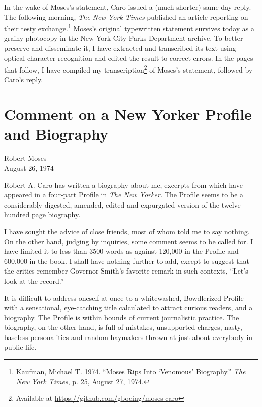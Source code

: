 \documentclass[11pt,letterpaper]{article}
\begin{document}
In the wake of Moses's statement, Caro issued a (much shorter) same-day reply. The following morning, \textit{The New York Times} published an article reporting on their testy exchange.\footnote{Kaufman, Michael T. 1974. \enquote{Moses Rips Into \enquote{Venomous} Biography.} \textit{The New York Times}, p. 25, August 27, 1974.} Moses's original typewritten statement survives today as a grainy photocopy in the New York City Parks Department archive. To better preserve and disseminate it, I have extracted and transcribed its text using optical character recognition and edited the result to correct errors. In the pages that follow, I have compiled my transcription\footnote{Available at \href{https://github.com/gboeing/moses-caro}{https://github.com/gboeing/moses-caro}} of Moses's statement, followed by Caro's reply.

\newpage

\section*{Comment on a New Yorker Profile and Biography}

\noindent Robert Moses\\
\noindent August 26, 1974\\
\vspace{1cm}

\noindent Robert A. Caro has written a biography about me, excerpts from which have appeared in a four-part Profile in \textit{The New Yorker.} The Profile seems to be a considerably digested, amended, edited and expurgated version of the twelve hundred page biography.

I have sought the advice of close friends, most of whom told me to say nothing. On the other hand, judging by inquiries, some comment seems to be called for. I have limited it to less than 3500 words as against 120,000 in the Profile and 600,000 in the book. I shall have nothing further to add, except to suggest that the critics remember Governor Smith's favorite remark in such contexts, \enquote{Let's look at the record.}

It is difficult to address oneself at once to a whitewashed, Bowdlerized Profile with a sensational, eye-catching title calculated to attract curious readers, and a biography. The Profile is within bounds of current journalistic practice. The biography, on the other hand, is full of mistakes, unsupported charges, nasty, baseless personalities and random haymakers thrown at just about everybody in public life.
\end{document}
